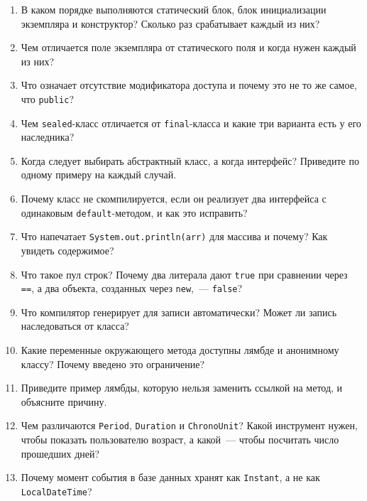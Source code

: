 \begin{enumerate}
\item В каком порядке выполняются статический блок, блок инициализации
      экземпляра и конструктор? Сколько раз срабатывает каждый из них?
\item Чем отличается поле экземпляра от статического поля и когда нужен
      каждый из них?
\item Что означает отсутствие модификатора доступа и почему это не то же
      самое, что \texttt{public}?
\item Чем \texttt{sealed}-класс отличается от \texttt{final}-класса и какие
      три варианта есть у его наследника?
\item Когда следует выбирать абстрактный класс, а когда интерфейс? Приведите
      по одному примеру на каждый случай.
\item Почему класс не скомпилируется, если он реализует два интерфейса с
      одинаковым \texttt{default}-методом, и как это исправить?
\item Что напечатает \texttt{System.out.println(arr)} для массива и почему?
      Как увидеть содержимое?
\item Что такое пул строк? Почему два литерала дают \texttt{true} при
      сравнении через \texttt{==}, а два объекта, созданных через
      \texttt{new},~--- \texttt{false}?
\item Что компилятор генерирует для записи автоматически? Может ли запись
      наследоваться от класса?
\item Какие переменные окружающего метода доступны лямбде и анонимному
      классу? Почему введено это ограничение?
\item Приведите пример лямбды, которую нельзя заменить ссылкой на метод, и
      объясните причину.
\item Чем различаются \texttt{Period}, \texttt{Duration} и
      \texttt{ChronoUnit}? Какой инструмент нужен, чтобы показать
      пользователю возраст, а какой~--- чтобы посчитать число прошедших дней?
\item Почему момент события в базе данных хранят как \texttt{Instant}, а не
      как \texttt{LocalDateTime}?
\end{enumerate}

\testzadaniya

